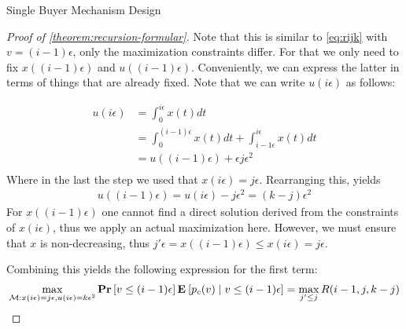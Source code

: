 \documentclass[11pt,a4paper]{article}
\renewcommand{\Pr}[1]{\mbox{\rm\bf Pr}\left[#1\right]}
\newcommand{\Ex}[2][]{\mbox{\rm\bf E}_{#1}\left[#2\right]}
\newcommand{\1}[1]{\mbox{\rm\bf 1}_{#1}}
\begin{document}
\begin{section}{Single Buyer Mechanism Design}
\begin{proof}[Proof of \autoref{theorem:recursion-formular}]
     Note that this is similar to \autoref{eq:rijk} with $v = (i-1) \epsilon$, only the maximization constraints differ.
     For that we only need to fix $x((i-1)\epsilon)$ and $u((i-1)\epsilon)$.
     Conveniently, we can express the latter in terms of things that are already fixed.
     Note that we can write $u(i\epsilon)$ as follows:

     \begin{align*}
         u(i\epsilon) & = \int_0^{i\epsilon} x(t) dt                                             \\
                      & = \int_0^{(i-1)\epsilon} x(t) dt + \int_{i-1\epsilon}^{i\epsilon} x(t)dt \\
                      & = u((i-1)\epsilon) + \epsilon j \epsilon^2                               \\
     \end{align*}
     Where in the last the step we used that $x(i\epsilon) = j\epsilon$.
     Rearranging this, yields
     \begin{align*}
         u((i-1)\epsilon) = u(i\epsilon) - j \epsilon^2 = (k - j) \epsilon^2
     \end{align*}
     For $x((i - 1)\epsilon)$ one cannot find a direct solution derived from the constraints of $x(i\epsilon)$, thus we apply an actual maximization here.
     However, we must ensure that $x$ is non-decreasing, thus $j' \epsilon = x((i-1)\epsilon) \leq x(i\epsilon) = j\epsilon$.

     Combining this yields the following expression for the first term:
     \begin{align*}
         \max_{\mathcal{M}: x(i\epsilon) = j\epsilon, u(i\epsilon) = k \epsilon^2} \Pr{v \leq (i-1)\epsilon} \Ex{p_c(v) \mid v \leq (i - 1) \epsilon} = \max_{j' \leq j} R(i-1, j, k - j)
     \end{align*}


\end{proof}
\end{section}
\end{document}
